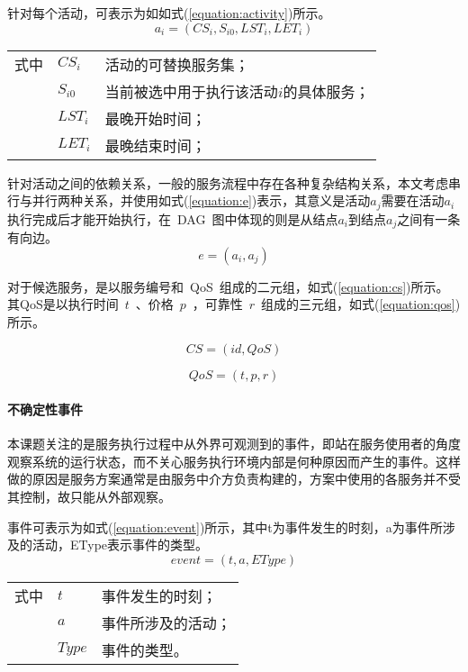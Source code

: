 针对每个活动，可表示为如如式(\ref{equation:activity})所示。
\begin{equation}\label{equation:activity}
{a_i} = ({CS_i}, {S_{i0}}, {LST_i}, {LET_i})
\end{equation}
\begin{tabularx}{\textwidth}{@{}l@{\quad}l@{\pozhehao }X@{}}
    式中
    & ${CS_i}$ & 活动的可替换服务集；\\
    & ${S_{i0}}$ & 当前被选中用于执行该活动$i$的具体服务；\\
    & ${LST_i}$ & 最晚开始时间；\\
    & ${LET_i}$ & 最晚结束时间；
\end{tabularx}\vspace{\wordsep}

针对活动之间的依赖关系，一般的服务流程中存在各种复杂结构关系，本文考虑串行与并行两种关系，并使用如式(\ref{equation:e})表示，其意义是活动${a_j}$需要在活动${a_i}$执行完成后才能开始执行，在~DAG~图中体现的则是从结点${a_i}$到结点${a_j}$之间有一条有向边。
\begin{equation}\label{equation:e}
e = ({a_i},{a_j})
\end{equation}

对于候选服务，是以服务编号和~QoS~组成的二元组，如式(\ref{equation:cs})所示。其QoS是以执行时间~$t$~、价格~$p$~，可靠性~$r$~组成的三元组，如式(\ref{equation:qos})所示。

\begin{equation}\label{equation:cs}
CS = (id, QoS)
\end{equation}

\begin{equation}\label{equation:qos}
QoS = (t, p, r)
\end{equation}

\paragraph{不确定性事件} 

本课题关注的是服务执行过程中从外界可观测到的事件，即站在服务使用者的角度观察系统的运行状态，而不关心服务执行环境内部是何种原因而产生的事件。这样做的原因是服务方案通常是由服务中介方负责构建的，方案中使用的各服务并不受其控制，故只能从外部观察。

事件可表示为如式(\ref{equation:event})所示，其中t为事件发生的时刻，a为事件所涉及的活动，EType表示事件的类型。
\begin{equation}\label{equation:event}
event = (t, a, EType)
\end{equation}
\begin{tabularx}{\textwidth}{@{}l@{\quad}l@{\pozhehao }X@{}}
    式中
    & $t$ & 事件发生的时刻；\\
    & $a$ & 事件所涉及的活动；\\
    & $Type$ &事件的类型。
\end{tabularx}\vspace{\wordsep}


